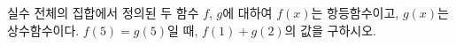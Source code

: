 \hspace*{2mm}\begin{minipage}[t]{\dimexpr\linewidth-2mm\relax}\vspace{0pt}
실수 전체의 집합에서 정의된 두 함수 $f$, $g$에 대하여 $f(x)$는 항등함수이고, $g(x)$는 상수함수이다. $f(5)=g(5)$일 때, $f(1)+g(2)$의 값을 구하시오.\end{minipage}
